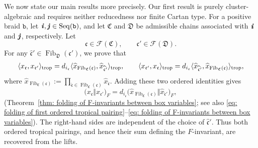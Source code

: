 \documentclass[12pt, leqno]{amsart}
\numberwithin{equation}{section}
\theoremstyle{plain}
\theoremstyle{definition}
\newcommand{\seteq}{\mathbin{:=}}
\newcommand{\trop}{{\rm trop}}
\newcommand{\ii}{ \textbf{\textit{i}}}
\newcommand{\jj}{ \textbf{\textit{j}}}
\newcommand{\Fib}{\operatorname{Fib}}
\newcommand{\hx}{\widehat{x}}
\newcommand{\frakC}{\mathfrak{C}}
\newcommand{\frakD}{\mathfrak{D}}
\newcommand{\frakc}{\mathfrak{c}}
\newcommand{\hfrakc}{\widehat{\frakc}}
\newcommand{\calF}{\mathcal{F}}
\newcommand{\ttb}{\mathtt{b}}
\newcommand{\Seq}{\mathrm{Seq}}
\begin{document}
We now state our main results more precisely.  Our first result is purely cluster-algebraic and requires neither
reducedness nor finite Cartan type.
For a positive braid \(\ttb\), let \(\ii,\jj\in\Seq(\ttb)\), and let \(\frakC\) and
\(\frakD\) be admissible chains associated with \(\ii\) and
\(\jj\), respectively. Let
\[
\frakc\in\calF(\frakC),
\qquad
\frakc'\in\calF(\frakD).
\]
For any
\(\hfrakc'\in\Fib_{\frakD}(\frakc')\), we prove that
\[
\begin{aligned}
\langle x_\frakc,x_{\frakc'}\rangle_{\trop}
=d_{i_\frakc}
\langle\hx_{\Fib_{\frakC}(\frakc)},\hx_{\hfrakc'}\rangle_{\trop},\qquad
\langle x_{\frakc'},x_\frakc\rangle_{\trop}
=d_{i_\frakc}
\langle\hx_{\hfrakc'},\hx_{\Fib_{\frakC}(\frakc)}\rangle_{\trop},
\end{aligned}
\]
where
\(
\hx_{\Fib_{\frakC}(\frakc)}
\seteq \prod_{\hfrakc\in\Fib_{\frakC}(\frakc)}\hx_{\hfrakc}
\).
Adding these two ordered identities gives
\[
\bigl(x_\frakc\Vert x_{\frakc'}\bigr)_F
=  d_{i_\frakc} \bigl( \hx_{\Fib_{\frakC}(\frakc)} \Vert \hx_{\hfrakc'}
\bigr)_F,
\]
(Theorem~\ref{thm: folding of F-invariants between box variables};
see also
\eqref{eq: folding of first ordered tropical pairing}--\eqref{eq: folding of F-invariants between box variables}).
The right-hand sides are independent of the choice of
\(\hfrakc'\).  Thus both ordered tropical pairings, and hence their
sum defining the \(F\)-invariant, are recovered from the lifts.

\smallskip
\end{document}
